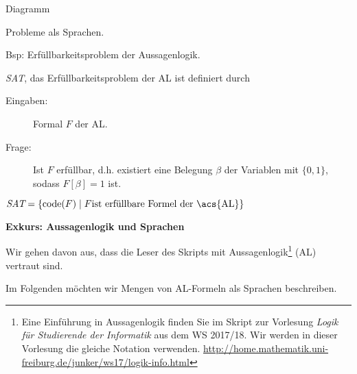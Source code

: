 {Diagramm

\bigskip

Probleme als Sprachen.

Bsp: Erfüllbarkeitsproblem der Aussagenlogik.

\begin{Def}[name={[\textit{SAT}: Erfüllbarkeitsproblem der \acs*{AL}]}]
	\textit{SAT}, das Erfüllbarkeitsproblem der \acf{AL} ist  definiert durch
	\begin{description}
	\item[Eingaben:] Formal $F$ der \acl{AL}.
	\item[Frage:] Ist $F$ erfüllbar, d.h. existiert eine Belegung $\beta$ der Variablen mit $\{0,1\}$, sodass $F[\beta]=1$ ist.
	\end{description}
	$\textit{SAT}=\{\code(F) \mid F\text{ist erfüllbare Formel der \acs{AL}}\}$
\end{Def}

}

\textbf{Exkurs: Aussagenlogik und Sprachen}

Wir gehen davon aus, dass die Leser des Skripts mit Aussagenlogik\footnote{
Eine Einführung in Aussagenlogik finden Sie im Skript zur Vorlesung \emph{Logik für Studierende der Informatik} aus dem WS 2017/18.
Wir werden in dieser Vorlesung die gleiche Notation verwenden.
\url{http://home.mathematik.uni-freiburg.de/junker/ws17/logik-info.html}
} (\ac{AL})
vertraut sind.

Im Folgenden möchten wir Mengen von \ac{AL}-Formeln als Sprachen beschreiben.


